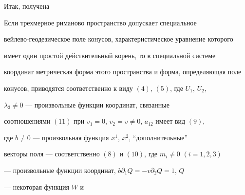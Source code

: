 Итак, получена 


 


\begin{thm} 


Если трехмерное риманово пространство допускает специальное 


вейлево-гео\-де\-зи\-чес\-кое поле конусов, характеристическое уравнение которого 


имеет один простой действительный корень, то в специальной системе 


координат метрическая форма этого пространства и форма, определяющая поле 


конусов, приводятся соответственно к виду $(4)$, $(5)$, где $U_1$, $U_2$, 


$\lambda_3\ne0$ --- произвольные функции координат, связанные 


соотношениями $(11)$ при $v_1=0$, $v_2=v\ne0$, $a_{12}$ имеет вид $(9)$, 


где $b\ne0$ --- произвольная функция $x^1$, $x^2$, ``дополнительные'' 


векторы поля --- соответственно $(8)$ и $(10)$, где $m_i\ne0$ $(i=1,2,3)$ 


--- произвольные функции координат, $b\partial_1Q=-v\partial_2Q=1$, $Q$ 


--- некоторая функция $W$ и 


\end{thm}
